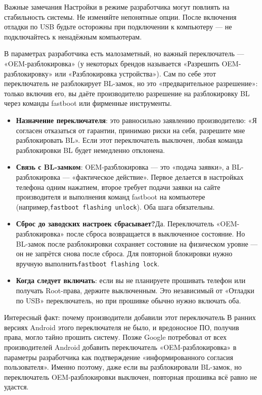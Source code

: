 \begin{tcbwarn}{Важные замечания}
Настройки в режиме разработчика могут повлиять на стабильность системы. Не изменяйте непонятные опции. После включения отладки по USB будьте осторожны при подключении к компьютеру — не подключайтесь к ненадёжным компьютерам.

\end{tcbwarn}


В параметрах разработчика есть малозаметный, но важный переключатель — «OEM-разблокировка» (у некоторых брендов называется «Разрешить OEM-разблокировку» или «Разблокировка устройства»). Сам по себе этот переключатель не разблокирует BL-замок, но это «предварительное разрешение»: только включив его, вы даёте производителю разрешение на разблокировку BL через команды fastboot или фирменные инструменты.

\begin{itemize}
  \item \textbf{Назначение переключателя}: это равносильно заявлению производителю: «Я согласен отказаться от гарантии, принимаю риски на себя, разрешите мне разблокировать BL». Если этот переключатель выключен, любая команда разблокировки BL будет немедленно отклонена.
  \item \textbf{Связь с BL-замком}: OEM-разблокировка — это «подача заявки», а BL-разблокировка — «фактическое действие». Первое делается в настройках телефона одним нажатием, второе требует подачи заявки на сайте производителя и выполнения команд fastboot на компьютере (например,\texttt{fastboot flashing unlock}). Оба шага обязательны.
  \item \textbf{Сброс до заводских настроек сбрасывает?}Да. Переключатель «OEM-разблокировка» после сброса возвращается в выключенное состояние. Но BL-замок после разблокировки сохраняет состояние на физическом уровне — он не запрётся снова после сброса. Для повторной блокировки нужно вручную выполнить\texttt{fastboot flashing lock}.
  \item \textbf{Когда следует включать}: если вы не планируете прошивать телефон или получать Root-права, держите выключенным. Это независимый от «Отладки по USB» переключатель, но при прошивке обычно нужно включать оба.
\end{itemize}

\begin{tcbinfo}{Интересный факт: почему производители добавили этот переключатель}
В ранних версиях Android этого переключателя не было, и вредоносное ПО, получив права, могло тайно прошить систему. Позже Google потребовал от всех производителей Android добавить переключатель «OEM-разблокировка» в параметры разработчика как подтверждение «информированного согласия пользователя». Именно поэтому, даже если вы разблокировали BL-замок, но переключатель OEM-разблокировки выключен, повторная прошивка всё равно не удастся.

\end{tcbinfo}

